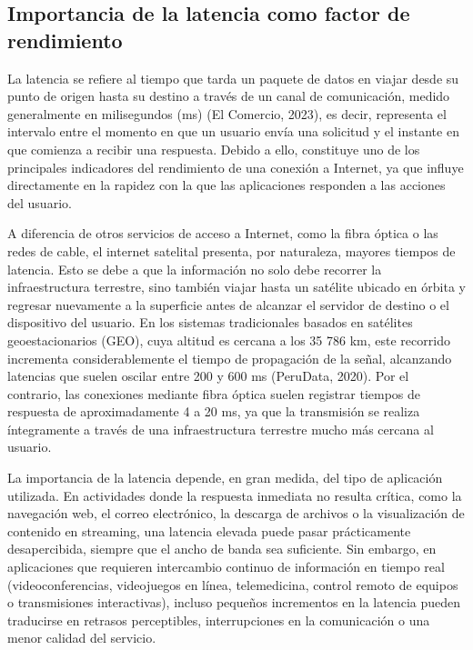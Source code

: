 \subsection{ Importancia de la latencia como factor de rendimiento}
La latencia se refiere al tiempo que tarda un paquete de datos en viajar desde su punto de origen hasta su destino a través de un canal de comunicación, medido generalmente en milisegundos (ms) (El Comercio, 2023), es decir, representa el intervalo entre el momento en que un usuario envía una solicitud y el instante en que comienza a recibir una respuesta. Debido a ello, constituye uno de los principales indicadores del rendimiento de una conexión a Internet, ya que influye directamente en la rapidez con la que las aplicaciones responden a las acciones del usuario.

A diferencia de otros servicios de acceso a Internet, como la fibra óptica o las redes de cable, el internet satelital presenta, por naturaleza, mayores tiempos de latencia. Esto se debe a que la información no solo debe recorrer la infraestructura terrestre, sino también viajar hasta un satélite ubicado en órbita y regresar nuevamente a la superficie antes de alcanzar el servidor de destino o el dispositivo del usuario. En los sistemas tradicionales basados en satélites geoestacionarios (GEO), cuya altitud es cercana a los 35 786 km, este recorrido incrementa considerablemente el tiempo de propagación de la señal, alcanzando latencias que suelen oscilar entre 200 y 600 ms (PeruData, 2020). Por el contrario, las conexiones mediante fibra óptica suelen registrar tiempos de respuesta de aproximadamente 4 a 20 ms, ya que la transmisión se realiza íntegramente a través de una infraestructura terrestre mucho más cercana al usuario.

La importancia de la latencia depende, en gran medida, del tipo de aplicación utilizada. En actividades donde la respuesta inmediata no resulta crítica, como la navegación web, el correo electrónico, la descarga de archivos o la visualización de contenido en streaming, una latencia elevada puede pasar prácticamente desapercibida, siempre que el ancho de banda sea suficiente. Sin embargo, en aplicaciones que requieren intercambio continuo de información en tiempo real (videoconferencias, videojuegos en línea, telemedicina, control remoto de equipos o transmisiones interactivas), incluso pequeños incrementos en la latencia pueden traducirse en retrasos perceptibles, interrupciones en la comunicación o una menor calidad del servicio.


